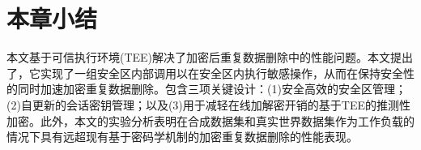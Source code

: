 \section{本章小结}
\label{sec:sgxdedup-sgxdedup-conclusion}

本文基于可信执行环境(TEE)解决了加密后重复数据删除中的性能问题。本文提出了\sysnameS，它实现了一组安全区内部调用以在安全区内执行敏感操作，从而在保持安全性的同时加速加密重复数据删除。\sysnameS 包含三项关键设计：(1)安全高效的安全区管理；(2)自更新的会话密钥管理；以及(3)用于减轻在线加解密开销的基于TEE的推测性加密。此外，本文的实验分析表明\sysnameS 在合成数据集和真实世界数据集作为工作负载的情况下具有远超现有基于密码学机制的加密重复数据删除的性能表现。
